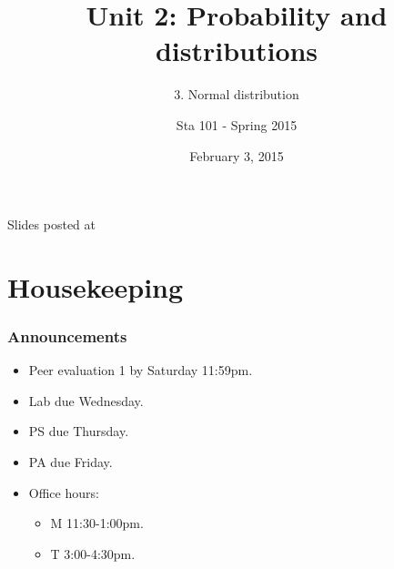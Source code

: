 \documentclass[slidestop,compress,mathserif,12pt,t,professionalfonts,xcolor=table]{beamer}
\title{Unit 2: Probability and distributions}
\subtitle{3. Normal distribution}
\author{Sta 101 - Spring 2015}
\date{February 3, 2015}
\institute{Duke University, Department of Statistical Science}
\begin{document}



\begin{frame}[plain]

\titlepage
\vfill
{\scriptsize {} \hfill Slides posted at  \webLink{\CourseSite}{\CourseSite}}
\addtocounter{framenumber}{-1} 

\end{frame}


\section{Housekeeping}


\begin{frame}
\frametitle{Announcements}

\begin{itemize}

\item Peer evaluation 1 by Saturday 11:59pm.

\item Lab due Wednesday.

\item PS due Thursday.

\item PA due Friday.

\item Office hours: 



\begin{itemize}
\item M 11:30-1:00pm.
\item T 3:00-4:30pm.
\end{itemize}

\end{itemize}


\end{frame}
\end{document}
